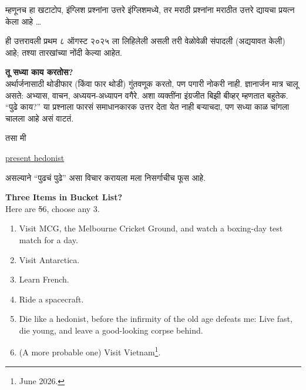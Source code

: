 \documentclass[17pt]{extarticle}  %
\begin{document}
म्हणूनच हा खटाटोप, इंग्लिश प्रश्नांना उत्तरे इंग्लिशमध्ये, तर मराठी प्रश्नांना मराठीत उत्तरे द्यायचा प्रयत्न केला आहे \dots

ही उत्तरावली प्रथम ८ ऑगस्ट २०२५ ला लिहिलेली असली तरी वेळोवेळी संपादली (अद्ययावत केली) आहे; तश्या तारखांच्या नोंदी केल्या आहेत.

\begin{enumerate}
\item
\textbf{तू सध्या काय करतोस?}\\
अर्थार्जनासाठी थोडीफार (किंवा फार थोडी) गुंतवणूक करतो, पण पगारी नोकरी नाही. ज्ञानार्जन मात्र चालू असते: अभ्यास, वाचन, अध्ययन-अध्यापन वगैरे. अशा व्यक्तींना इंग्रजीत बिझी बीव्हर् म्हणतात बहुतेक. \enquote{पुढे काय?} या प्रश्नाला फारसं समाधानकारक उत्तर देता येत नाही बऱ्याचदा, पण सध्या काळ चांगला चालला आहे असं वाटतं. 

तसा मी \begin{english} \href{https://en.wikipedia.org/wiki/Hedonism}{present hedonist}\end{english} असल्याने \enquote{पुढचं पुढे} असा विचार करायला मला निसर्गाचीच फूस आहे.

\begin{english}

\item \textbf{Three Items in Bucket List?}\\
Here are \sout{5}6, choose any 3.
\begin{enumerate}
\item Visit MCG, the Melbourne Cricket Ground, and watch a boxing-day test match for a day.
\item Visit Antarctica.
\item Learn French.
\item Ride a spacecraft.
\item Die like a hedonist, before the infirmity of the old age defeats me: Live fast, die young, and leave a good-looking corpse behind.
  \item (A more probable one) Visit Vietnam\footnote{June 2026.}.
\end{enumerate}


\end{english}
\end{enumerate}
\end{document}
